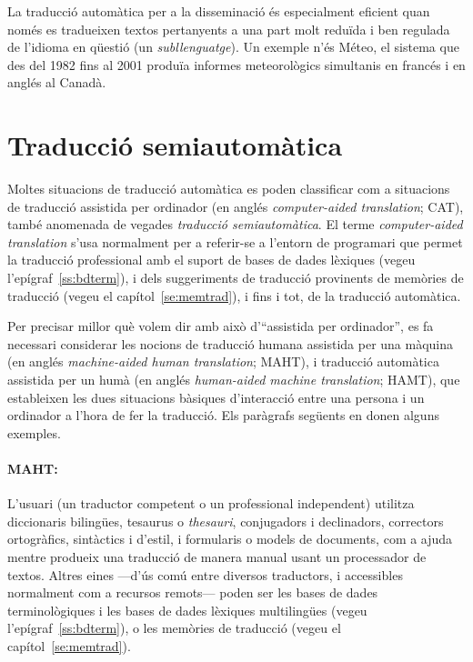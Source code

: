 La traducció automàtica per a la disseminació és especialment eficient
quan només es tradueixen textos pertanyents a una part molt reduïda i
ben regulada de l'idioma en qüestió (un \emph{subllenguatge}).  Un
exemple n'és Méteo, el sistema que des del 1982 fins al 2001 produïa
informes meteorològics simultanis en francés i en anglés al Canadà.

\section{Traducció semiautomàtica} 
\label{se:cat}
Moltes situacions de traducció automàtica es poden classificar com a
situacions de traducció assistida per ordinador (en anglés
\emph{computer-aided translation}; CAT), també anomenada de vegades
\emph{traducció semiautomàtica}.  El terme \emph{computer-aided
  translation} s'usa normalment per a referir-se a l'entorn de
programari que permet la traducció professional amb el suport de bases
de dades lèxiques (vegeu l'epígraf~\ref{ss:bdterm}), i dels
suggeriments de traducció provinents de memòries de traducció (vegeu
el capítol~\ref{se:memtrad}), i fins i tot, de la traducció
automàtica.

Per precisar millor què volem dir amb això d'``assistida per
ordinador'', es fa necessari considerar les nocions de traducció
humana assistida per una màquina (en anglés \emph{machine-aided human
  translation}; MAHT), i traducció automàtica assistida per un humà
(en anglés \emph{human-aided machine translation}; HAMT), que
estableixen les dues situacions bàsiques d'interacció entre una
persona i un ordinador a l'hora de fer la traducció. Els paràgrafs
següents en donen alguns exemples.

\paragraph{MAHT:} L'usuari (un traductor competent o un professional
independent) utilitza diccionaris bilingües, tesaurus o \emph{thesauri},
conjugadors i declinadors, correctors ortogràfics, sintàctics i
d'estil, i formularis o models de documents, com a ajuda mentre
produeix una traducció de manera manual usant un processador de
textos. Altres eines ---d'ús comú entre diversos traductors, i
accessibles normalment com a recursos remots--- poden ser les bases de
dades terminològiques i les bases de dades lèxiques multilingües
(vegeu l'epígraf~\ref{ss:bdterm}), o les memòries de traducció (vegeu
el capítol~\ref{se:memtrad}). 

